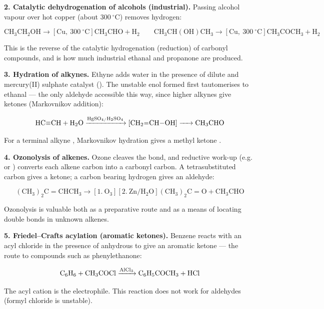 \documentclass[11pt]{article}
\begin{document}
\textbf{2. Catalytic dehydrogenation of alcohols (industrial).} Passing alcohol vapour over hot copper (about $300\ ^\circ$C) removes hydrogen:

\[ \ensuremath{\mathrm{CH_{3}CH_{2}OH \rightarrow [Cu,\ 300\ ^\circ C] CH_{3}CHO + H_{2}}} \qquad \ensuremath{\mathrm{CH_{3}CH(OH)CH_{3} \rightarrow [Cu,\ 300\ ^\circ C] CH_{3}COCH_{3} + H_{2}}} \]

This is the reverse of the catalytic hydrogenation (reduction) of carbonyl compounds, and is how much industrial ethanal and propanone are produced.

\textbf{3. Hydration of alkynes.} Ethyne adds water in the presence of dilute  and mercury(II) sulphate catalyst (). The unstable enol formed first tautomerises to ethanal — the only aldehyde accessible this way, since higher alkynes give ketones (Markovnikov addition):

\[ \ce{HC#CH + H2O ->[HgSO4/H2SO4] [CH2=CH-OH] -> CH3CHO} \]

For a terminal alkyne , Markovnikov hydration gives a methyl ketone .

\textbf{4. Ozonolysis of alkenes.} Ozone cleaves the  bond, and reductive work-up (e.g.  or ) converts each alkene carbon into a carbonyl carbon. A tetrasubstituted carbon gives a ketone; a carbon bearing hydrogen gives an aldehyde:

\[ \ensuremath{\mathrm{(CH_{3})_{2}C=CHCH_{3} \rightarrow [1.\ O_{3}][2.\ Zn/H_{2}O] (CH_{3})_{2}C=O + CH_{3}CHO}} \]

Ozonolysis is valuable both as a preparative route and as a means of locating double bonds in unknown alkenes.

\textbf{5. Friedel–Crafts acylation (aromatic ketones).} Benzene reacts with an acyl chloride in the presence of anhydrous  to give an aromatic ketone — the route to compounds such as phenylethanone:

\[ \ce{C6H6 + CH3COCl ->[AlCl3] C6H5COCH3 + HCl} \]

The acyl cation  is the electrophile. This reaction does not work for aldehydes (formyl chloride is unstable).
\end{document}
